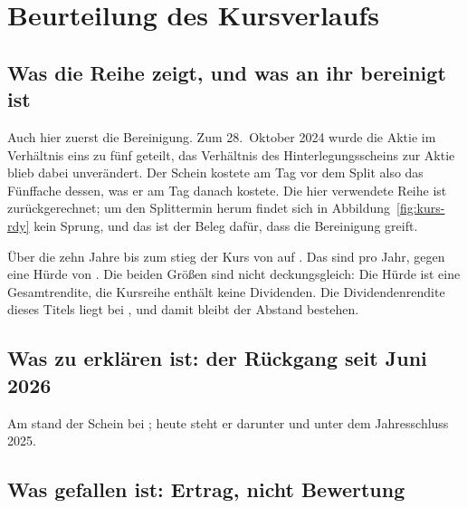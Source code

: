 \section{Beurteilung des Kursverlaufs}
\label{sec:kurs-rdy}

\subsection{Was die Reihe zeigt, und was an ihr bereinigt ist}

Auch hier zuerst die Bereinigung. Zum 28.~Oktober 2024 wurde die Aktie im
Verh\"altnis eins zu f\"unf geteilt, das Verh\"altnis des
Hinterlegungsscheins zur Aktie blieb dabei
unver\"andert.
Der Schein kostete am Tag vor dem Split also das F\"unffache dessen, was er am
Tag danach kostete. Die hier verwendete Reihe ist zur\"uckgerechnet; um den
Splittermin herum findet sich in Abbildung~\ref{fig:kurs-rdy} kein Sprung, und
das ist der Beleg daf\"ur, dass die Bereinigung greift.

\"Uber die zehn Jahre bis zum \Datum{\RdyKursTag} stieg der Kurs von
\USDje{\RdyKursSchlussXVI} auf \USDje{\RdyKurs}. Das sind
\Pct{\RdyRenditeZehn} pro Jahr, gegen eine H\"urde von \Pct{\Huerde}. Die
beiden Gr\"o{\ss}en sind nicht deckungsgleich: Die H\"urde ist eine
Gesamtrendite, die Kursreihe enth\"alt keine Dividenden. Die
Dividendenrendite dieses Titels liegt bei \Pct{\RdyDividendenrendite}, und
damit bleibt der Abstand bestehen.


\subsection{Was zu erkl\"aren ist: der R\"uckgang seit Juni 2026}

Am \Datum{\RdyKurstagHoch} stand der Schein bei \USDje{\RdyKursHochXXVI}; heute
steht er \PctBetrag{\RdyAbstandHoch} darunter und
\PctBetrag{\RdyRenditeLaufend} unter dem Jahresschluss 2025.

\subsection{Was gefallen ist: Ertrag, nicht Bewertung}



